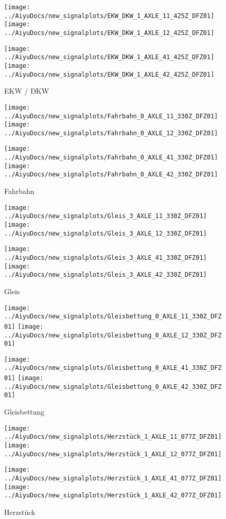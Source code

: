 \begin{figure}[H]
	\centering
	\texttt{[image: ../AiyuDocs/new\_signalplots/EKW\_DKW\_1\_AXLE\_11\_425Z\_DFZ01]}
	\texttt{[image: ../AiyuDocs/new\_signalplots/EKW\_DKW\_1\_AXLE\_12\_425Z\_DFZ01]}
	
	\texttt{[image: ../AiyuDocs/new\_signalplots/EKW\_DKW\_1\_AXLE\_41\_425Z\_DFZ01]}
	\texttt{[image: ../AiyuDocs/new\_signalplots/EKW\_DKW\_1\_AXLE\_42\_425Z\_DFZ01]}
	\caption{EKW / DKW}
\end{figure}

\begin{figure}[H]
	\centering
	\texttt{[image: ../AiyuDocs/new\_signalplots/Fahrbahn\_0\_AXLE\_11\_330Z\_DFZ01]}
	\texttt{[image: ../AiyuDocs/new\_signalplots/Fahrbahn\_0\_AXLE\_12\_330Z\_DFZ01]}
	
	\texttt{[image: ../AiyuDocs/new\_signalplots/Fahrbahn\_0\_AXLE\_41\_330Z\_DFZ01]}
	\texttt{[image: ../AiyuDocs/new\_signalplots/Fahrbahn\_0\_AXLE\_42\_330Z\_DFZ01]}
	\caption{Fahrbahn}
\end{figure}

\begin{figure}[H]
	\centering
	\texttt{[image: ../AiyuDocs/new\_signalplots/Gleis\_3\_AXLE\_11\_330Z\_DFZ01]}
	\texttt{[image: ../AiyuDocs/new\_signalplots/Gleis\_3\_AXLE\_12\_330Z\_DFZ01]}
	
	\texttt{[image: ../AiyuDocs/new\_signalplots/Gleis\_3\_AXLE\_41\_330Z\_DFZ01]}
	\texttt{[image: ../AiyuDocs/new\_signalplots/Gleis\_3\_AXLE\_42\_330Z\_DFZ01]}
	\caption{Gleis}
\end{figure}

\begin{figure}[H]
	\centering
	\texttt{[image: ../AiyuDocs/new\_signalplots/Gleisbettung\_0\_AXLE\_11\_330Z\_DFZ01]}
	\texttt{[image: ../AiyuDocs/new\_signalplots/Gleisbettung\_0\_AXLE\_12\_330Z\_DFZ01]}
	
	\texttt{[image: ../AiyuDocs/new\_signalplots/Gleisbettung\_0\_AXLE\_41\_330Z\_DFZ01]}
	\texttt{[image: ../AiyuDocs/new\_signalplots/Gleisbettung\_0\_AXLE\_42\_330Z\_DFZ01]}
	\caption{Gleisbettung}
\end{figure}

\begin{figure}[H]
	\centering
	\texttt{[image: ../AiyuDocs/new\_signalplots/Herzstück\_1\_AXLE\_11\_077Z\_DFZ01]}
	\texttt{[image: ../AiyuDocs/new\_signalplots/Herzstück\_1\_AXLE\_12\_077Z\_DFZ01]}
	
	\texttt{[image: ../AiyuDocs/new\_signalplots/Herzstück\_1\_AXLE\_41\_077Z\_DFZ01]}
	\texttt{[image: ../AiyuDocs/new\_signalplots/Herzstück\_1\_AXLE\_42\_077Z\_DFZ01]}
	\caption{Herzstück}
\end{figure}

